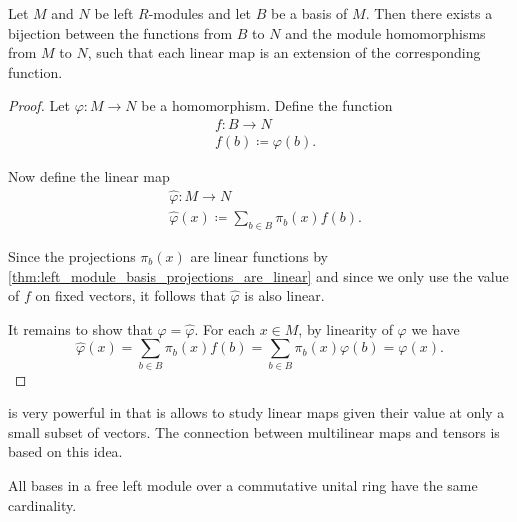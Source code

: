 \begin{theorem}\label{thm:linear_map_iff_function_on_basis}
  Let \( M \) and \( N \) be left \( R \)-modules and let \( B \) be a basis of \( M \). Then there exists a bijection between the functions from \( B \) to \( N \) and the module homomorphisms from \( M \) to \( N \), such that each linear map is an extension of the corresponding function.
\end{theorem}
\begin{proof}
  Let \( \varphi: M \to N \) be a homomorphism. Define the function
  \begin{align*}
    &f: B \to N \\
    &f(b) \coloneqq \varphi(b).
  \end{align*}

  Now define the linear map
  \begin{align*}
    &\hat \varphi: M \to N \\
    &\hat \varphi(x) \coloneqq \sum_{b \in B} \pi_b(x) f(b).
  \end{align*}

  Since the projections \( \pi_b(x) \) are linear functions by \cref{thm:left_module_basis_projections_are_linear} and since we only use the value of \( f \) on fixed vectors, it follows that \( \hat \varphi \) is also linear.

  It remains to show that \( \varphi = \hat \varphi \). For each \( x \in M \), by linearity of \( \varphi \) we have
  \begin{equation*}
    \hat \varphi(x)
    =
    \sum_{b \in B} \pi_b(x) f(b)
    =
    \sum_{b \in B} \pi_b(x) \varphi(b)
    =
    \varphi(x).
  \end{equation*}
\end{proof}

\begin{remark}\label{remark:linear_map_iff_function_on_basis}
   is very powerful in that is allows to study linear maps given their value at only a small subset of vectors. The connection between multilinear maps and tensors is based on this idea.
\end{remark}

\begin{proposition}\label{thm:left_module_basis_cardinality}\cite{ProofWiki:bases_of_free_module_have_same_cardinality}
  All bases in a free left module over a commutative unital ring have the same cardinality.
\end{proposition}

